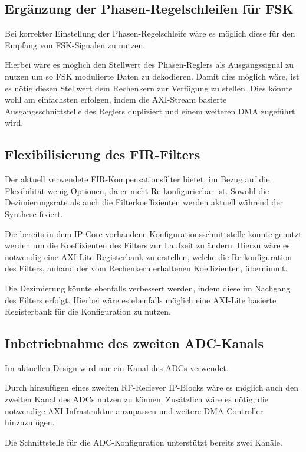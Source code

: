 \subsection{Ergänzung der Phasen-Regelschleifen für \acs{FSK}}
Bei korrekter Einstellung der Phasen-Regelschleife wäre es möglich diese für den Empfang von \acs{FSK}-Signalen zu nutzen.

Hierbei wäre es möglich den Stellwert des Phasen-Reglers als Ausgangssignal zu nutzen um so \acs{FSK} modulierte Daten zu dekodieren.
Damit dies möglich wäre, ist es nötig diesen Stellwert dem Rechenkern zur Verfügung zu stellen. 
Dies könnte wohl am einfachsten erfolgen, indem die \acs{AXI}-Stream basierte Ausgangsschnittstelle des Reglers dupliziert und einem weiteren \acs{DMA} zugeführt wird.

\subsection{Flexibilisierung des \acs{FIR}-Filters}
Der aktuell verwendete \acs{FIR}-Kompensationsfilter bietet, im Bezug auf die Flexibilität wenig Optionen, da er nicht Re-konfigurierbar ist.
Sowohl die Dezimierungsrate als auch die Filterkoeffizienten werden aktuell während der Synthese fixiert.

Die bereits in dem IP-Core vorhandene Konfigurationsschnittstelle könnte genutzt werden um die Koeffizienten des Filters zur Laufzeit zu ändern.
Hierzu wäre es notwendig eine \acs{AXI}-Lite Registerbank zu erstellen, welche die Re-konfiguration des Filters, anhand der vom Rechenkern erhaltenen Koeffizienten, übernimmt.

Die Dezimierung könnte ebenfalls verbessert werden, indem diese im Nachgang des Filters erfolgt.
Hierbei wäre es ebenfalls möglich eine \acs{AXI}-Lite basierte Registerbank für die Konfiguration zu nutzen.

\subsection{Inbetriebnahme des zweiten \acs{ADC}-Kanals}
Im aktuellen Design wird nur ein Kanal des \acs{ADC}s verwendet.

Durch hinzufügen eines zweiten RF-Reciever IP-Blocks wäre es möglich auch den zweiten Kanal des \acs{ADC}s nutzen zu können.
Zusätzlich wäre es nötig, die notwendige \acs{AXI}-Infrastruktur anzupassen und weitere \acs{DMA}-Controller hinzuzufügen.

Die Schnittstelle für die \acs{ADC}-Konfiguration unterstützt bereits zwei Kanäle.



